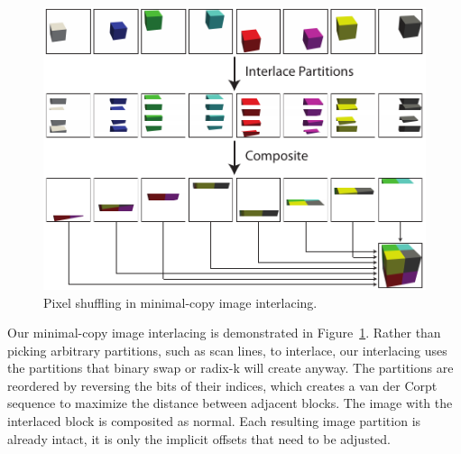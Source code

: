 \documentclass{vgtc}                          %
\begin{document}
\begin{figure}[htbp]
  \centering
  \includegraphics{images/InterlaceDiagram}
  \caption{Pixel shuffling in minimal-copy image interlacing.}
  \label{fig:Interlacing}
\end{figure}

Our minimal-copy image interlacing is demonstrated in
Figure~\ref{fig:Interlacing}.  Rather than picking arbitrary partitions,
such as scan lines, to interlace, our interlacing uses the partitions that
binary swap or radix-k will create anyway.  The partitions are reordered by
reversing the bits of their indices, which creates a van der Corpt sequence
to maximize the distance between adjacent blocks.  The image with the
interlaced block is composited as normal.  Each resulting image partition
is already intact, it is only the implicit offsets that need to be
adjusted.
\end{document}
